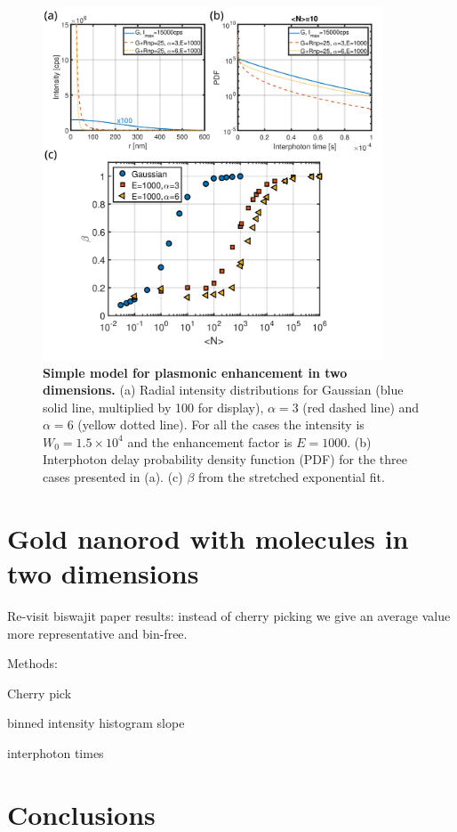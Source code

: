 \begin{figure}
\includegraphics[width=0.9\textwidth]{enhancement_model}%
\caption{\textbf{Simple model for plasmonic enhancement  in two dimensions.} (a) Radial intensity distributions for Gaussian (blue solid line, multiplied by 100 for display), $\alpha=3$ (red dashed line) and $\alpha=6$ (yellow dotted line). 
For all the cases the intensity is $W_0=1.5\times10^4$ and the enhancement factor is $E=1000$.
(b) Interphoton delay probability density function (PDF) for the three cases presented in (a).
(c) $\beta$ from the stretched exponential fit.
\label{fg:enahncement_model}}
\end{figure}



\section{Gold nanorod with molecules in two dimensions}


Re-visit biswajit paper results: instead of cherry picking we give an average value more representative and bin-free.

Methods:

Cherry pick

binned intensity histogram slope

interphoton times

\section{Conclusions}

